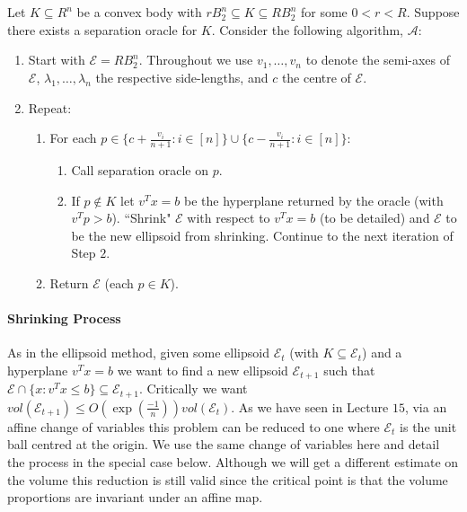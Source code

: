\documentclass[letterpaper,12pt,oneside,onecolumn]{article}
\newcommand{\cA}{\mathcal{A}} \newcommand{\cB}{\mathcal{B}}
\newcommand{\cE}{\mathcal{E}} \newcommand{\cF}{\mathcal{F}}
\begin{document}
\section{}
Let $K \subseteq R^n$ be a convex body with $rB^n_2 \subseteq K \subseteq RB^n_2$ for some $0 < r < R$. Suppose there exists a separation oracle for $K$. Consider the following algorithm, $\cA$:
\begin{enumerate}
\item Start with $\cE = RB^n_2$. Throughout we use $v_1, \dots, v_n$ to denote the semi-axes of $\cE$, $\lambda_1, \dots, \lambda_n$ the respective side-lengths, and $c$ the centre of $\cE$.
\item Repeat:
	\begin{enumerate}
	\item For each $p \in \{ c+ \frac{v_i}{n+1} : i \in [n]\} \cup \{c-\frac{v_i}{n+1} : i \in [n]\}$:
		\begin{enumerate}
		\item Call separation oracle on $p$.
		\item If $p \not \in K$ let $v^Tx = b$ be the hyperplane returned by the oracle (with $v^Tp > b$). ``Shrink" $\cE$ with respect to $v^Tx=b$ (to be detailed) and $\cE$ to be the new ellipsoid from shrinking. Continue to the next iteration of Step $2$.
		\end{enumerate}
	\item Return $\cE$ (each $p \in K$).
	\end{enumerate}
\end{enumerate}
\paragraph{Shrinking Process}
As in the ellipsoid method, given some ellipsoid $\cE_t$ (with $K \subseteq \cE_t$) and a hyperplane $v^Tx = b$ we want to find a new ellipsoid $\cE_{t+1}$ such that $\cE \cap \{x : v^Tx \leq b\} \subseteq \cE_{t+1}$. Critically we want $vol(\cE_{t+1}) \leq O(\exp(\frac{-1}{n}))  vol(\cE_t)$. As we have seen in Lecture $15$, via an affine change of variables this problem can be reduced to one where $\cE_t$ is the unit ball centred at the origin. We use the same change of variables here and detail the process in the special case below. Although we will get a different estimate on the volume this reduction is still valid since the critical point is that the volume proportions are invariant under an affine map.
\end{document}
